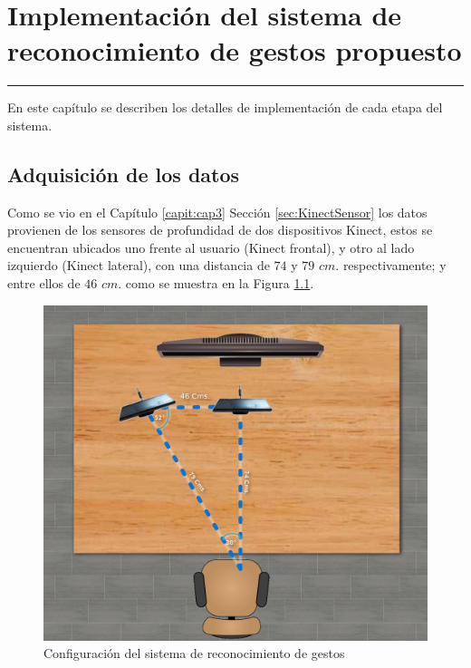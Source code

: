 \chapter{Implementación del sistema de reconocimiento de gestos propuesto}\label{capit:cap4}
\vspace{-2.0325ex}%
\noindent
\rule{\textwidth}{0.5pt}
\vspace{-5.5ex}%
\newcommand{\pushline}{\Indp}%

En este cap\'itulo se describen los detalles de implementación de cada etapa del sistema.   

\section{Adquisición de los datos}\label{sec:AdquisicionDatos}

Como se vio en el Capítulo \ref{capit:cap3} Sección \ref{sec:KinectSensor} los datos provienen de los sensores de profundidad de dos dispositivos Kinect, estos se encuentran ubicados uno frente al usuario (Kinect frontal), y otro al lado  izquierdo (Kinect lateral), con una distancia de $74$ y $79$ $cm.$ respectivamente; y entre ellos de $46$ $cm.$ como se muestra en la Figura \ref{fig:SetupSystem}.
\begin{figure}[!h]
\begin{center}
\includegraphics[scale=.2]{./Figures/system.png}
\end{center}
\caption{Configuración del sistema de reconocimiento de gestos}
\label{fig:SetupSystem}
\end{figure}  


